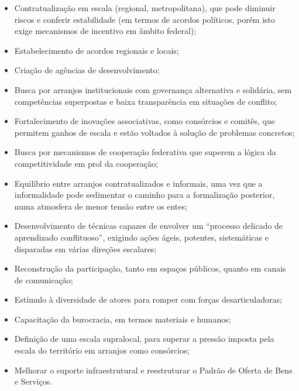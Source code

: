 \documentclass[
article,			%
11pt,				%
oneside,			%
a4paper,			%
english,			%
brazil,				%
sumario=tradicional
]{abntex2}
\begin{document}
	\begin{itemize}
		\item Contratualização em escala (regional, metropolitana), que pode diminuir riscos e conferir estabilidade (em termos de acordos políticos, porém isto exige mecanismos de incentivo em âmbito federal);
		\item Estabelecimento de acordos regionais e locais;
		\item Criação de agências de desenvolvimento;
		\item Busca por arranjos institucionais com governança alternativa e solidária, sem competências superpostas e baixa transparência em situações de conflito;
		\item Fortalecimento de inovações associativas, como consórcios e comitês, que permitem ganhos de escala e estão voltados à solução de problemas concretos;
		\item Busca por mecanismos de cooperação federativa que superem a lógica da competitividade em prol da cooperação;
		\item Equilíbrio entre arranjos contratualizados e informais, uma vez que a informalidade pode sedimentar o caminho para a formalização posterior, numa atmosfera de menor tensão entre os entes;
		\item Desenvolvimento de técnicas capazes de envolver um ``processo delicado de aprendizado conflituoso'', exigindo ações ágeis, potentes, sistemáticas e disparadas em várias direções escalares;
		\item Reconstrução da participação, tanto em espaços públicos, quanto em canais de comunicação;
		\item Estímulo à diversidade de atores para romper com forças desarticuladoras;
		\item Capacitação da burocracia, em termos materiais e humanos;
		\item Definição de uma escala supralocal, para superar a pressão imposta pela escala do território em arranjos como consórcios;
		\item Melhorar o suporte infraestrutural e reestruturar o Padrão de Oferta de Bens e Serviços.
	\end{itemize}

	
	\postextual
	
\end{document}
